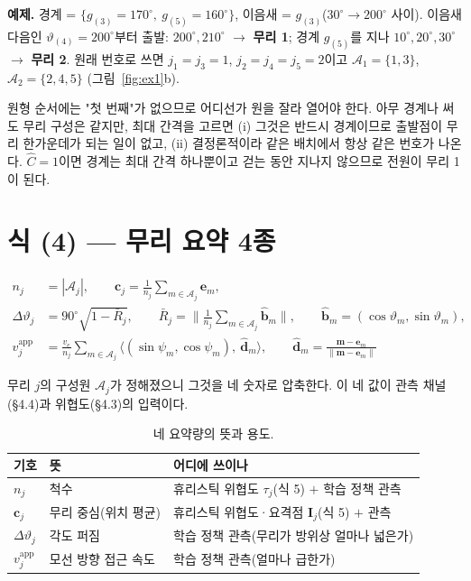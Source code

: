 \documentclass[11pt,a4paper]{article}
\newcommand{\vt}{\vartheta}
\newcommand{\bfe}{\mathbf{e}}
\newcommand{\bfm}{\mathbf{m}}
\newcommand{\bfc}{\mathbf{c}}
\newcommand{\bhat}{\hat{\mathbf{b}}}
\newcommand{\dhat}{\hat{\mathbf{d}}}
\newcommand{\vapp}{v^{\mathrm{app}}}
\begin{document}
\textbf{예제.} 경계 = $\{g_{(3)}=170^\circ,\ g_{(5)}=160^\circ\}$, 이음새 = $g_{(3)}$($30^\circ\!\to\!200^\circ$ 사이).
이음새 다음인 $\vt_{(4)}=200^\circ$부터 출발: $200^\circ, 210^\circ$ $\to$ \textbf{무리 1}; 경계 $g_{(5)}$를 지나 $10^\circ, 20^\circ, 30^\circ$ $\to$ \textbf{무리 2}.
원래 번호로 쓰면 $j_1 = j_3 = 1$, $j_2 = j_4 = j_5 = 2$이고 $\mathcal A_1 = \{1, 3\}$, $\mathcal A_2 = \{2, 4, 5\}$ (그림~\ref{fig:ex1}b).

\begin{whybox}
원형 순서에는 "첫 번째"가 없으므로 어디선가 원을 잘라 열어야 한다. 아무 경계나 써도 무리 구성은 같지만, 최대 간격을 고르면 (i) 그것은 반드시 경계이므로 출발점이 무리 한가운데가 되는 일이 없고, (ii) 결정론적이라 같은 배치에서 항상 같은 번호가 나온다. $\hat C=1$이면 경계는 최대 간격 하나뿐이고 걷는 동안 지나지 않으므로 전원이 무리 1이 된다.
\end{whybox}

\section{식 (4) --- 무리 요약 4종}

\begin{equation*}
\begin{aligned}
n_j &= |\mathcal A_j|, \qquad
\bfc_j = \frac{1}{n_j}\sum_{m\in\mathcal A_j}\bfe_m,\\
\Delta\vt_j &= 90^\circ\sqrt{1-\bar R_j}, \qquad
\bar R_j = \Big\lVert \frac{1}{n_j}\sum_{m\in\mathcal A_j}\bhat_m \Big\rVert, \qquad \bhat_m = (\cos\vt_m, \sin\vt_m),\\[2pt]
\vapp_j &= \frac{v_e}{n_j}\sum_{m\in\mathcal A_j}\big\langle(\sin\psi_m, \cos\psi_m),\ \dhat_m\big\rangle, \qquad
\dhat_m = \frac{\bfm-\bfe_m}{\lVert\bfm-\bfe_m\rVert}
\end{aligned} \tag{4}
\end{equation*}

무리 $j$의 구성원 $\mathcal A_j$가 정해졌으니 그것을 네 숫자로 압축한다. 이 네 값이 관측 채널(\S4.4)과 위협도(\S4.3)의 입력이다.

\begin{table}[H]
\centering\small
\caption{네 요약량의 뜻과 용도.}
\begin{tabular}{l l l}
\toprule
기호 & 뜻 & 어디에 쓰이나 \\
\midrule
$n_j$ & 척수 & 휴리스틱 위협도 $\tau_j$(식 5) $+$ 학습 정책 관측 \\
$\bfc_j$ & 무리 중심(위치 평균) & 휴리스틱 위협도·요격점 $\mathbf I_j$(식 5) $+$ 관측 \\
$\Delta\vt_j$ & 각도 퍼짐 & 학습 정책 관측(무리가 방위상 얼마나 넓은가) \\
$\vapp_j$ & 모선 방향 접근 속도 & 학습 정책 관측(얼마나 급한가) \\
\bottomrule
\end{tabular}
\end{table}
\end{document}
